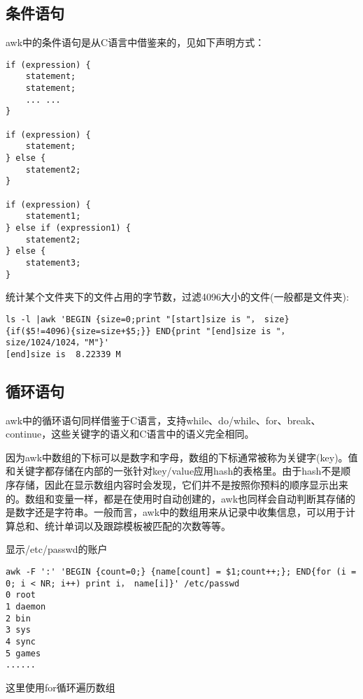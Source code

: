 \documentclass[12pt]{article}
\begin{document}
\subsection{条件语句}
 awk中的条件语句是从C语言中借鉴来的，见如下声明方式：
\begin{lstlisting} 
if (expression) {
    statement;
    statement;
    ... ...
}

if (expression) {
    statement;
} else {
    statement2;
}

if (expression) {
    statement1;
} else if (expression1) {
    statement2;
} else {
    statement3;
}
\end{lstlisting} 

统计某个文件夹下的文件占用的字节数，过滤4096大小的文件(一般都是文件夹):
\begin{lstlisting} 
ls -l |awk 'BEGIN {size=0;print "[start]size is "， size} {if($5!=4096){size=size+$5;}} END{print "[end]size is "， size/1024/1024，"M"}' 
[end]size is  8.22339 M
\end{lstlisting} 

\subsection{循环语句}

awk中的循环语句同样借鉴于C语言，支持while、do/while、for、break、continue，这些关键字的语义和C语言中的语义完全相同。

因为awk中数组的下标可以是数字和字母，数组的下标通常被称为关键字(key)。值和关键字都存储在内部的一张针对key/value应用hash的表格里。由于hash不是顺序存储，因此在显示数组内容时会发现，它们并不是按照你预料的顺序显示出来的。数组和变量一样，都是在使用时自动创建的，awk也同样会自动判断其存储的是数字还是字符串。一般而言，awk中的数组用来从记录中收集信息，可以用于计算总和、统计单词以及跟踪模板被匹配的次数等等。

 
显示/etc/passwd的账户

\begin{lstlisting} 
awk -F ':' 'BEGIN {count=0;} {name[count] = $1;count++;}; END{for (i = 0; i < NR; i++) print i， name[i]}' /etc/passwd
0 root
1 daemon
2 bin
3 sys
4 sync
5 games
......
\end{lstlisting} 
这里使用for循环遍历数组
\end{document}
